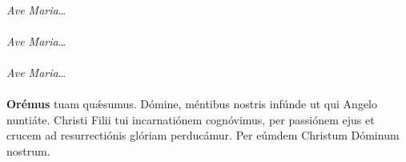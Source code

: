 \\[1mm]
\textit{Ave Maria}\ldots\\[1mm]
\\[1mm]
\textit{Ave Maria}\ldots\\[1mm]
\\[1mm]
\textit{Ave Maria}\ldots\\[1mm]
\orapronobissalve\\[2mm]
\textbf{Orémus}
 tuam qu{\'\ae}sumus. Dómine, méntibus nostris infúnde ut qui Angelo nuntiáte.
Christi Filii tui incarnatiónem cognóvimus, per passiónem ejus et crucem ad resurrectiónis glóriam perducámur.
Per eúmdem Christum Dóminum nostrum.\\[1mm]
